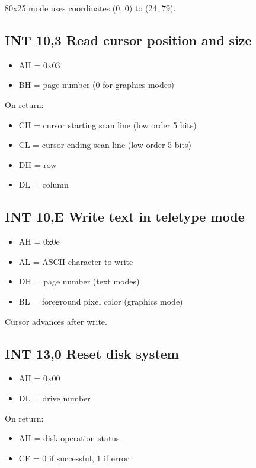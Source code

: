 80x25 mode uses coordinates (0, 0) to (24, 79).

\subsection{INT 10,3 Read cursor position and size}
\begin{itemize}
  \item
    AH = 0x03
  \item
    BH = page number (0 for graphics modes)
\end{itemize}

On return:

\begin{itemize}
  \item
    CH = cursor starting scan line (low order 5 bits)
  \item
    CL = cursor ending scan line (low order 5 bits)
  \item
    DH = row
  \item
    DL = column
\end{itemize}


\subsection{INT 10,E Write text in teletype mode}
\begin{itemize}
  \item
    AH = 0x0e
  \item
    AL = ASCII character to write
  \item
    DH = page number (text modes)
  \item
    BL = foreground pixel color (graphics mode)
\end{itemize}

Cursor advances after write.

%
%
\subsection{INT 13,0 Reset disk system}
\begin{itemize}
  \item
    AH = 0x00
  \item
    DL = drive number
\end{itemize}

On return:

\begin{itemize}
  \item
    AH = disk operation status
  \item
    CF = 0 if successful, 1 if error
\end{itemize}

